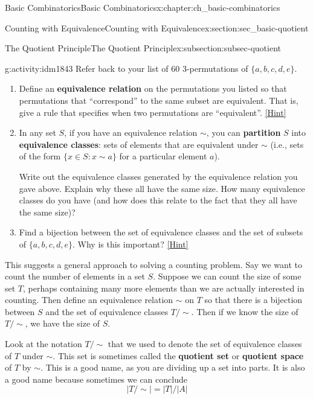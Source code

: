 \documentclass[oneside,10pt,]{book}
\newcommand{\terminology}[1]{\textbf{#1}}
\numberwithin{equation}{chapter}
\def\st{:}
\begin{document}
\begin{chapterptx}{Basic Combinatorics}{}{Basic Combinatorics}{}{}{x:chapter:ch_basic-combinatorics}
\begin{sectionptx}{Counting with Equivalence}{}{Counting with Equivalence}{}{}{x:section:sec_basic-quotient}
\begin{subsectionptx}{The Quotient Principle}{}{The Quotient Principle}{}{}{x:subsection:subsec-quotient}
\begin{activity}{}{g:activity:idm1843}%
Refer back to your list of 60 3-permutations of \(\{a,b,c,d,e\}\).%
\begin{enumerate}[font=\bfseries,label=(\alph*),ref=\alph*]
\item{}Define an \terminology{equivalence relation} on the permutations you listed so that permutations that ``correspond'' to the same subset are equivalent.  That is, give a rule that specifies when two permutations are ``equivalent''.%
\space\hspace*{0pt}\hfill{\tiny\hyperlink{g:hint:idm1853-back}{[Hint]}}\item{}In any set \(S\), if you have an equivalence relation \(\sim\), you can \terminology{partition} \(S\) into \terminology{equivalence classes}: sets of elements that are equivalent under \(\sim\) (i.e., sets of the form \(\{x \in S \st x \sim a\} \) for a particular element \(a\)).%
\par
Write out the equivalence classes generated by the equivalence relation you gave above.  Explain why these all have the same size.  How many equivalence classes do you have (and how does this relate to the fact that they all have the same size)?%
\item{}Find a bijection between the set of equivalence classes and the set of subsets of \(\{a,b,c,d,e\}\).  Why is this important?%
\space\hspace*{0pt}\hfill{\tiny\hyperlink{g:hint:idm1871-back}{[Hint]}}\end{enumerate}
\end{activity}
This suggests a general approach to solving a counting problem.  Say we want to count the number of elements in a set \(S\).  Suppose we can count the size of some set \(T\), perhaps containing many more elements than we are actually interested in counting.  Then define an equivalence relation \(\sim\) on \(T\) so that there is a bijection between \(S\) and the set of equivalence classes \(T/\sim\).  Then if we know the size of \(T/\sim\), we have the size of \(S\).%
\par
Look at the notation \(T/\sim\) that we used to denote the set of equivalence classes of \(T\) under \(\sim\).  This set is sometimes called the \terminology{quotient set} or \terminology{quotient space} of \(T\) by \(\sim\).  This is a good name, as you are dividing up a set into parts.  It is also a good name because sometimes we can conclude%
\begin{equation*}
|T/\sim| = |T|/|A|
\end{equation*}

\end{subsectionptx}
\end{sectionptx}
\end{chapterptx}
\end{document}
